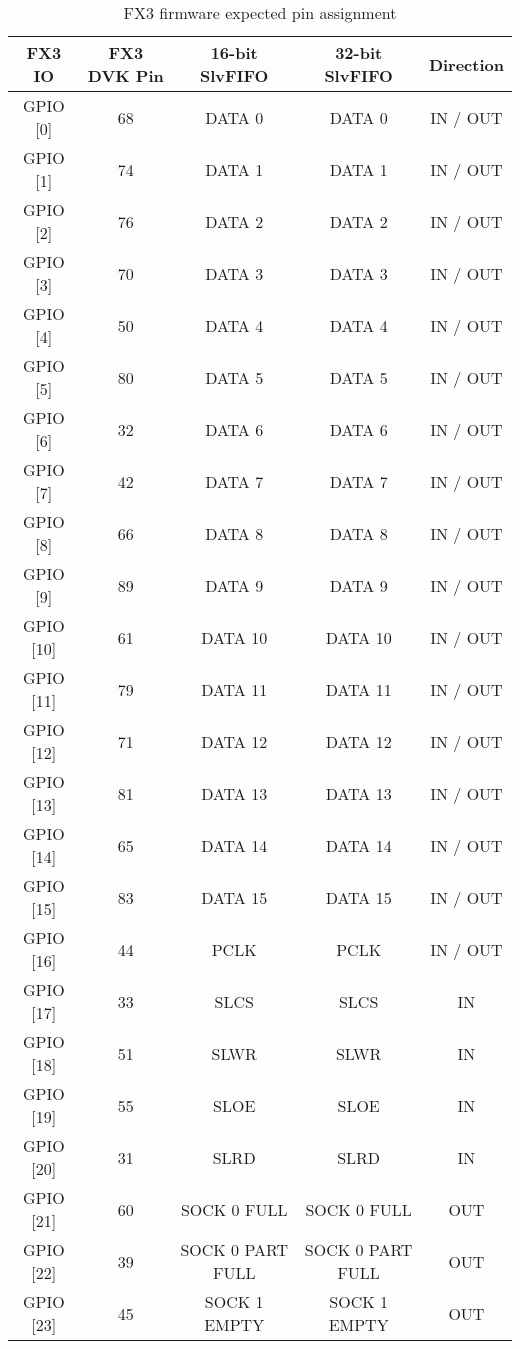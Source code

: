 \begin{center}
\begin{longtabu} to \linewidth {|c|c|c|c|c|}
\caption{FX3 firmware expected pin assignment} \label{tab:pin_assignment}
\\
\hline
FX3 IO & FX3 DVK Pin & 16-bit SlvFIFO & 32-bit SlvFIFO & Direction \\ \hline
GPIO [0] & 68 & DATA 0 & DATA 0 & IN / OUT \\ \hline
GPIO [1] & 74 & DATA 1 & DATA 1 & IN / OUT \\ \hline
GPIO [2] & 76 & DATA 2 & DATA 2 & IN / OUT \\ \hline
GPIO [3] & 70 & DATA 3 & DATA 3 & IN / OUT \\ \hline
GPIO [4] & 50 & DATA 4 & DATA 4 & IN / OUT \\ \hline
GPIO [5] & 80 & DATA 5 & DATA 5 & IN / OUT \\ \hline
GPIO [6] & 32 & DATA 6 & DATA 6 & IN / OUT \\ \hline
GPIO [7] & 42 & DATA 7 & DATA 7 & IN / OUT \\ \hline
GPIO [8] & 66 & DATA 8 & DATA 8 & IN / OUT \\ \hline
GPIO [9] & 89 & DATA 9 & DATA 9 & IN / OUT \\ \hline
GPIO [10] & 61 & DATA 10 & DATA 10 & IN / OUT \\ \hline
GPIO [11] & 79 & DATA 11 & DATA 11 & IN / OUT \\ \hline
GPIO [12] & 71 & DATA 12 & DATA 12 & IN / OUT \\ \hline
GPIO [13] & 81 & DATA 13 & DATA 13 & IN / OUT \\ \hline
GPIO [14] & 65 & DATA 14 & DATA 14 & IN / OUT \\ \hline
GPIO [15] & 83 & DATA 15 & DATA 15 & IN / OUT \\ \hline
GPIO [16] & 44 & PCLK & PCLK & IN / OUT \\ \hline
GPIO [17] & 33 & SLCS & SLCS & IN \\ \hline
GPIO [18] & 51 & SLWR & SLWR & IN \\ \hline
GPIO [19] & 55 & SLOE & SLOE & IN \\ \hline
GPIO [20] & 31 & SLRD & SLRD & IN \\ \hline
GPIO [21] & 60 & SOCK 0 FULL & SOCK 0 FULL & OUT \\ \hline
GPIO [22] & 39 & SOCK 0 PART FULL & SOCK 0 PART FULL & OUT \\ \hline
GPIO [23] & 45 & SOCK 1 EMPTY & SOCK 1 EMPTY & OUT \\ \hline

\end{longtabu}
\end{center}
